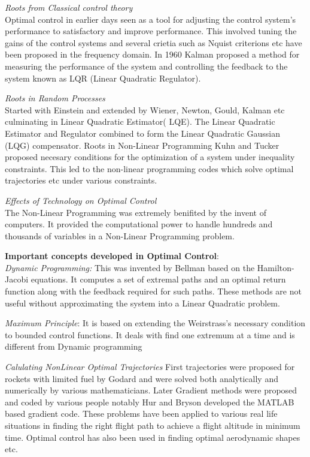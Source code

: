 \begin{enumerate}
\emph{Roots from Classical control theory}\\
Optimal control in earlier days seen as a tool for adjusting the control system's performance to satisfactory and improve performance. This involved tuning the gains of the control systems and several crietia such as Nquist criterions etc have been proposed in the frequency domain.
In 1960 Kalman proposed a method for measuring the performance of the system and controlling the feedback to the system known as LQR (Linear Quadratic Regulator). 

\emph{Roots in Random Processes}\\
Started with Einstein and extended by Wiener, Newton, Gould, Kalman etc culminating in Linear Quadratic Estimator( LQE). The Linear Quadratic Estimator and Regulator combined to form the Linear Quadratic Gaussian (LQG) compensator.
Roots in Non-Linear Programming
Kuhn and Tucker proposed necesary conditions for the optimization of a system under inequality constraints. This led to the non-linear programming codes which solve optimal trajectories etc under various constraints. 

\emph{Effects of Technology on Optimal Control}\\
The Non-Linear Programming was extremely benifited by the invent of computers. It provided the computational power to handle hundreds and thousands of variables in a Non-Linear Programming problem.

\textbf{Important concepts developed in Optimal Control}:\\

\emph{Dynamic Programming:}\quad 
This was invented by Bellman based on the Hamilton-Jacobi equations. It computes a set of extremal paths and an optimal return function along with the feedback required for such paths. These methods are not useful without approximating the system into a Linear Quadratic problem.

\emph{Maximum Principle}: \quad
It is based on extending the Weirstrass's necessary condition to bounded control functions. It deals with find one extremum at a time and is different from Dynamic programming

\emph{Calulating NonLinear Optimal Trajectories}
First trajectories were proposed for rockets with limited fuel by Godard and were solved both analytically and numerically by various mathematicians. Later Gradient methods were proposed and coded by various people notably Hur and Bryson developed the MATLAB based gradient code. 
These problems have been applied to various real life situations in finding the right flight path to achieve a flight altitude in minimum time. Optimal control has also been used in finding optimal aerodynamic shapes etc.


\end{enumerate}
